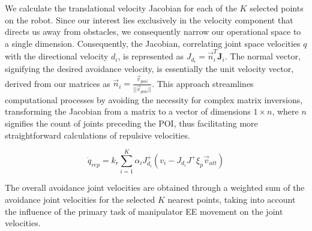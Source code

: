 \documentclass[letterpaper, 10 pt, conference]{ieeeconf}  %
\begin{document}

%

We calculate the translational velocity Jacobian for each of the $K$ selected points on the robot. Since our interest lies exclusively in the velocity component that directs us away from obstacles, we consequently narrow our operational space to a single dimension. Consequently, the Jacobian, correlating joint space velocities \(q\) with the directional velocity \(d_i\), is represented as \(J_{d_i} = \vec{n}_i^T \mathbf{J}_i\). The normal vector, signifying the desired avoidance velocity, is essentially the unit velocity vector, derived from our matrices as \(\vec{n}_{i} = \frac{\vec{v}_{poi i}}{||\vec{v}_{poi i}||}\). This approach streamlines computational processes by avoiding the necessity for complex matrix inversions, transforming the Jacobian from a matrix to a vector of dimensions \(1 \times n\), where \(n\) signifies the count of joints preceding the POI, thus facilitating more straightforward calculations of repulsive velocities.

\begin{equation}
	\dot{q}_{rep} = k_r \sum_{i=1}^{K} \alpha_i J_{d_i}^{+} \left(v_i - J_{d_i} J^{+} \xi_{p} \vec{v}_{att}\right)
\end{equation}


The overall avoidance joint velocities are obtained through a weighted sum of the avoidance joint velocities for the selected \(K\) nearest points, taking into account the influence of the primary task of manipulator EE movement on the joint velocities.
\end{document}
